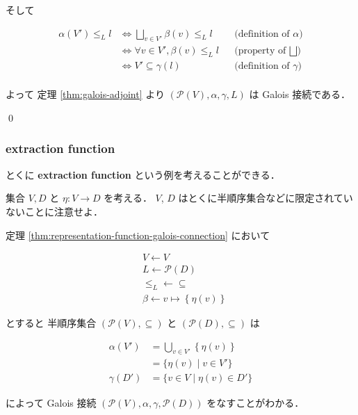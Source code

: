 \documentclass[uplatex]{jsarticle}
\begin{document}
そして

\begin{align*}
  \alpha(V') \leq_L l
   & \iff \bigsqcup_{v \in V'} \beta(v) \leq_L l
   &                                             & \text{(definition of $\alpha$)}  \\
   & \iff \forall v \in V', \beta(v) \leq_L l
   &                                             & \text{(property of $\bigsqcup$)} \\
   & \iff V' \subseteq \gamma(l)
   &                                             & \text{(definition of $\gamma$)}  \\
\end{align*}


よって 定理 \ref{thm:galois-adjoint} より
$(\mathcal{P}(V), \alpha, \gamma, L)$ は Galois 接続である．

\qed

\subsubsection{extraction function}

とくに \textbf{extraction function} という例を考えることができる．

集合 $V, D$ と $\eta: V \to D$ を考える．
$V$, $D$ はとくに半順序集合などに限定されていないことに注意せよ．

定理 \ref{thm:representation-function-galois-connection} において

\begin{align*}
   & V \leftarrow V                                      \\
   & L \leftarrow \mathcal{P}(D)                         \\
   & \leq_L \leftarrow \subseteq                         \\
   & \beta \leftarrow v \mapsto \left\{ \eta(v) \right\}
\end{align*}

とすると 半順序集合 $(\mathcal{P}(V), \subseteq)$ と $(\mathcal{P}(D), \subseteq)$ は

\begin{align*}
  \alpha(V') & = \bigcup_{v \in V'} \left\{ \eta(v) \right\} \\
             & = \{ \eta(v) \mid v \in V' \}                 \\
  \gamma(D') & = \{ v \in V \mid \eta(v) \in D' \}
\end{align*}

によって Galois 接続 $(\mathcal{P}(V), \alpha, \gamma, \mathcal{P}(D))$ をなすことがわかる．
\end{document}
